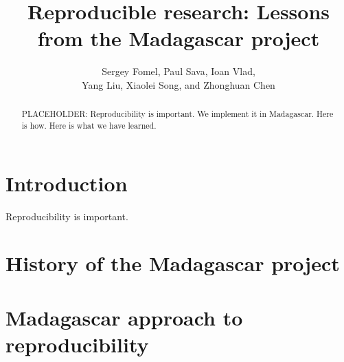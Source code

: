 \title{Reproducible research: Lessons from the Madagascar project}


\author{
Sergey Fomel\footnotemark[1],
Paul Sava\footnotemark[2],
Ioan Vlad\footnotemark[3], \\
Yang Liu\footnotemark[4],
Xiaolei Song\footnotemark[1], and
Zhonghuan Chen\footnotemark[5]
}

\address{
\footnotemark[1]Bureau of Economic Geology \\
Jackson School of Geosciences \\
The University of Texas at Austin \\
University Station, Box X \\
Austin, TX 78713-8972 \\
USA \\
\footnotemark[2] Department of Geophysics \\
Colorado School of Mines \\
Golden, CO 80401 \\
USA \\
\footnotemark[3] TGS \\
2500 CityWest Boulevard, Suite 2000 \\
Houston, Texas 77042
USA \\
\footnotemark[4] College of Geo-Exploration Science and Technology \\
Jilin University \\
No.938 Xi Minzhu Street \\
Changchun, Jilin Province 130026
China
}

\begin{abstract}
PLACEHOLDER: Reproducibility is important. We implement it in Madagascar. Here is how. Here is what we have learned.
\end{abstract}

\section{Introduction}

Reproducibility is important.

\section{History of the Madagascar project}

\section{Madagascar approach to reproducibility}

